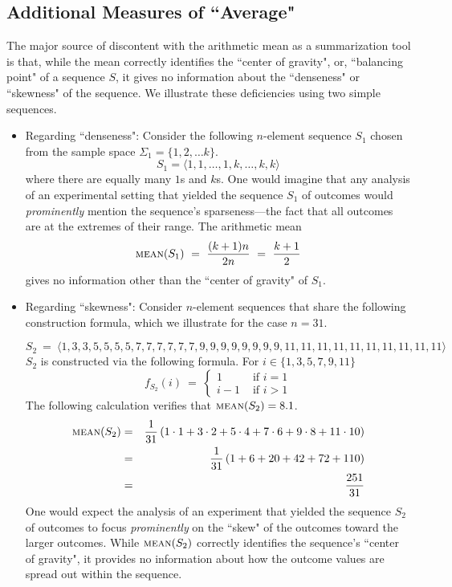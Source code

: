 \subsection{Additional Measures of ``Average"}
\label{sec:median-mode}

The major source of discontent with the arithmetic mean as a summarization tool is that, while the mean correctly identifies the ``center of gravity", or, ``balancing point" of a sequence $S$, it gives no information about the ``denseness" or ``skewness" of the sequence.  We illustrate these deficiencies using two simple sequences.
  
\begin{itemize}
\item
Regarding ``denseness":
Consider the following $n$-element sequence $S_1$ chosen from the sample space $\Sigma_1 = \{1, 2, \ldots k\}$.
\[ S_1 = \langle 1, 1, \ldots, 1, k, \ldots, k, k \rangle \]
where there are equally many $1$s and $k$s.  One would imagine that any analysis of an 
experimental setting that yielded the sequence $S_1$ of outcomes would {\em prominently} mention the sequence's sparseness---the fact that all outcomes are at the extremes of their range.  The arithmetic mean
\[  \mbox{\sc mean}(S_1) \ = \ \frac{(k+1)n}{2n} \ = \ {k+1 \over 2} \]
gives no information other than the ``center of gravity" of $S_1$.

\medskip\item
Regarding ``skewness":
Consider $n$-element sequences that share the following construction formula, which we illustrate for the case $n=31$.

{\small
\[ S_2 \ = \ \langle 
1,
3,3,
5,5,5,5,
7,7,7,7,7,7,
9,9,9,9,9,9,9,9,
11,11,11,11,11,11,11,11,11,11
\rangle \]
} 
\hspace*{-.1in} $S_2$ is constructed via the following formula.  For $i \in \{1,3,5,7,9,11\}$
\[ f_{S_2}(i) \ = \ \left\{ \begin{array}{cl}
1  & \mbox{ if } i=1 \\
 i-1& \mbox{ if } i>1
\end{array}  
\right.
\]
The following calculation verifies that $\mbox{\sc mean}(S_2) = 8.1$. 
\begin{eqnarray*}
\mbox{\sc mean}(S_2)
 & = & 
{1 \over 31}
\left(
1 \cdot 1 +
3 \cdot 2 +
5 \cdot 4 +
7 \cdot 6 +
9 \cdot 8 +
11 \cdot 10
\right)
 \\
  & = & 
{1 \over 31}
\left(
 1 + 6 + 20 + 42 + 72 + 110
\right)
 \\
  & = & 
\frac{251}{31}
\end{eqnarray*}
One would expect the analysis of an experiment that yielded the sequence $S_2$ of outcomes to focus {\em prominently} on the ``skew" of the outcomes toward the larger outcomes.  While $\mbox{\sc mean}(S_2)$ correctly identifies the sequence's ``center of gravity", it provides no information about how the outcome values are spread out within the sequence.
\end{itemize}


